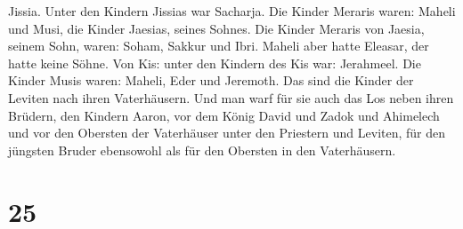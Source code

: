 Jissia. Unter den Kindern Jissias war Sacharja.  Die Kinder
Meraris waren: Maheli und Musi, die Kinder Jaesias, seines Sohnes.
 Die Kinder Meraris von Jaesia, seinem Sohn, waren: Soham,
Sakkur und Ibri.  Maheli aber hatte Eleasar, der hatte
keine Söhne.  Von Kis: unter den Kindern des Kis war:
Jerahmeel.  Die Kinder Musis waren: Maheli, Eder und
Jeremoth. Das sind die Kinder der Leviten nach ihren Vaterhäusern.
 Und man warf für sie auch das Los neben ihren Brüdern, den
Kindern Aaron, vor dem König David und Zadok und Ahimelech und vor den
Obersten der Vaterhäuser unter den Priestern und Leviten, für den
jüngsten Bruder ebensowohl als für den Obersten in den Vaterhäusern.

\hypertarget{section-24}{%
\section{25}\label{section-24}}

